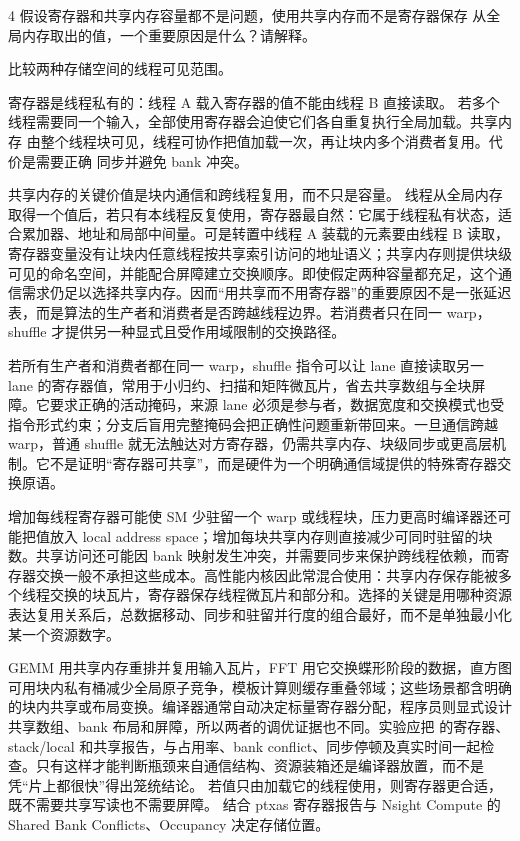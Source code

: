 \begin{solutionexercise}{4}
\problemheading 假设寄存器和共享内存容量都不是问题，使用共享内存而不是寄存器保存
从全局内存取出的值，一个重要原因是什么？请解释。

\approachheading 比较两种存储空间的线程可见范围。

\answerheading 寄存器是线程私有的：线程 A 载入寄存器的值不能由线程 B 直接读取。
若多个线程需要同一个输入，全部使用寄存器会迫使它们各自重复执行全局加载。共享内存
由整个线程块可见，线程可协作把值加载一次，再让块内多个消费者复用。代价是需要正确
同步并避免 bank 冲突。

\conclusionheading 共享内存的关键价值是块内通信和跨线程复用，而不只是容量。
\discussionheading
{}
线程从全局内存取得一个值后，若只有本线程反复使用，寄存器最自然：它属于线程私有状态，适合累加器、地址和局部中间量。可是转置中线程 A 装载的元素要由线程 B 读取，寄存器变量没有让块内任意线程按共享索引访问的地址语义；共享内存则提供块级可见的命名空间，并能配合屏障建立交换顺序。即使假定两种容量都充足，这个通信需求仍足以选择共享内存。因而“用共享而不用寄存器”的重要原因不是一张延迟表，而是算法的生产者和消费者是否跨越线程边界。若消费者只在同一 warp，shuffle 才提供另一种显式且受作用域限制的交换路径。

若所有生产者和消费者都在同一 warp，shuffle 指令可以让 lane 直接读取另一 lane 的寄存器值，常用于小归约、扫描和矩阵微瓦片，省去共享数组与全块屏障。它要求正确的活动掩码，来源 lane 必须是参与者，数据宽度和交换模式也受指令形式约束；分支后盲用完整掩码会把正确性问题重新带回来。一旦通信跨越 warp，普通 shuffle 就无法触达对方寄存器，仍需共享内存、块级同步或更高层机制。它不是证明“寄存器可共享”，而是硬件为一个明确通信域提供的特殊寄存器交换原语。

增加每线程寄存器可能使 SM 少驻留一个 warp 或线程块，压力更高时编译器还可能把值放入 local address space；增加每块共享内存则直接减少可同时驻留的块数。共享访问还可能因 bank 映射发生冲突，并需要同步来保护跨线程依赖，而寄存器交换一般不承担这些成本。高性能内核因此常混合使用：共享内存保存能被多个线程交换的块瓦片，寄存器保存线程微瓦片和部分和。选择的关键是用哪种资源表达复用关系后，总数据移动、同步和驻留并行度的组合最好，而不是单独最小化某一个资源数字。

GEMM 用共享内存重排并复用输入瓦片，FFT 用它交换蝶形阶段的数据，直方图可用块内私有桶减少全局原子竞争，模板计算则缓存重叠邻域；这些场景都含明确的块内共享或布局变换。编译器通常自动决定标量寄存器分配，程序员则显式设计共享数组、bank 布局和屏障，所以两者的调优证据也不同。实验应把  的寄存器、stack/local 和共享报告，与占用率、bank conflict、同步停顿及真实时间一起检查。只有这样才能判断瓶颈来自通信结构、资源装箱还是编译器放置，而不是凭“片上都很快”得出笼统结论。
\variantheading 若值只由加载它的线程使用，则寄存器更合适，既不需要共享写读也不需要屏障。
\practiceheading 结合 ptxas 寄存器报告与 Nsight Compute 的 Shared Bank Conflicts、Occupancy 决定存储位置。
\end{solutionexercise}


